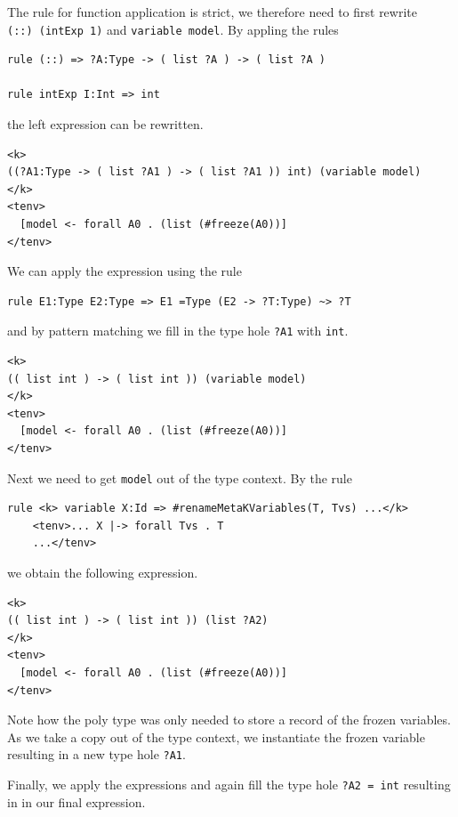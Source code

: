 \documentclass[]{scrbook}
\theoremstyle{definition}
\theoremstyle{definition}
\theoremstyle{definition}
\theoremstyle{remark}
\begin{document}
The rule for function application is strict, we therefore need to first
rewrite \texttt{(::)\ (intExp\ 1)} and \texttt{variable\ model}. By
appling the rules

\begin{verbatim}
rule (::) => ?A:Type -> ( list ?A ) -> ( list ?A )

rule intExp I:Int => int
\end{verbatim}

the left expression can be rewritten.

\begin{verbatim}
<k>
((?A1:Type -> ( list ?A1 ) -> ( list ?A1 )) int) (variable model)
</k>
<tenv>
  [model <- forall A0 . (list (#freeze(A0))]
</tenv>
\end{verbatim}

We can apply the expression using the rule

\begin{verbatim}
rule E1:Type E2:Type => E1 =Type (E2 -> ?T:Type) ~> ?T
\end{verbatim}

and by pattern matching we fill in the type hole \texttt{?A1} with
\texttt{int}.

\begin{verbatim}
<k>
(( list int ) -> ( list int )) (variable model)
</k>
<tenv>
  [model <- forall A0 . (list (#freeze(A0))]
</tenv>
\end{verbatim}

Next we need to get \texttt{model} out of the type context. By the rule

\begin{verbatim}
rule <k> variable X:Id => #renameMetaKVariables(T, Tvs) ...</k>
    <tenv>... X |-> forall Tvs . T
    ...</tenv>
\end{verbatim}

we obtain the following expression.

\begin{verbatim}
<k>
(( list int ) -> ( list int )) (list ?A2)
</k>
<tenv>
  [model <- forall A0 . (list (#freeze(A0))]
</tenv>
\end{verbatim}

Note how the poly type was only needed to store a record of the frozen
variables. As we take a copy out of the type context, we instantiate the
frozen variable resulting in a new type hole \texttt{?A1}.

Finally, we apply the expressions and again fill the type hole
\texttt{?A2\ =\ int} resulting in in our final expression.
\end{document}
